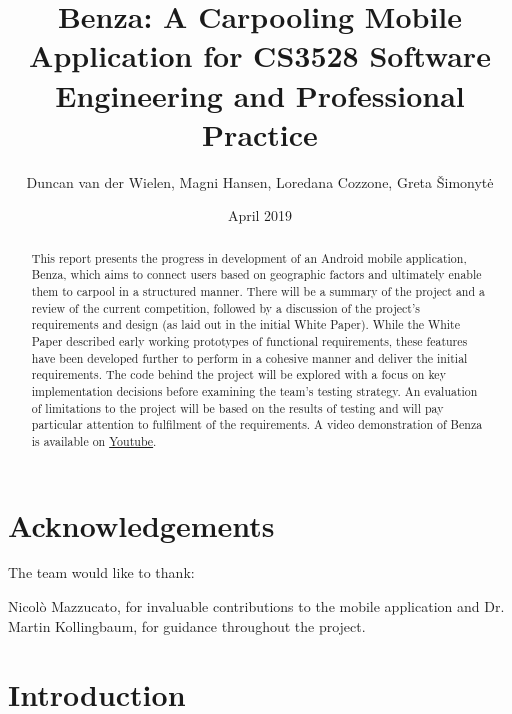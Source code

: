 \documentclass{article}
\title{Benza: A Carpooling Mobile Application for CS3528 Software Engineering and Professional Practice}
\author{Duncan van der Wielen, Magni Hansen, Loredana Cozzone, Greta Šimonytė}
\date{April 2019}
\begin{document}
\maketitle

\begin{abstract}
    This report presents the progress in development of an Android mobile application, Benza, which aims to connect users based on geographic factors and ultimately enable them to carpool in a structured manner. There will be a summary of the project and a review of the current competition, followed by a discussion of the project’s requirements and design (as laid out in the initial White Paper). While the White Paper described early working prototypes of functional requirements, these features have been developed further to perform in a cohesive manner and deliver the initial requirements. The code behind the project will be explored with a focus on key implementation decisions before examining the team’s testing strategy. An evaluation of limitations to the project will be based on the results of testing and will pay particular attention to fulfilment of the requirements. A video demonstration of Benza is available on \href{https://www.youtube.com/channel/UCFu91T9vGvJUtSXXUMHnAig?view_as=subscriber}{Youtube}.
\end{abstract}


\newpage
\tableofcontents


\newpage
\section{Acknowledgements}
The team would like to thank: \par
Nicolò Mazzucato, for invaluable contributions to the mobile application and Dr. Martin Kollingbaum, for guidance throughout the project.\par


\newpage
\section{Introduction}
\label{sec:intro}
\end{document}
